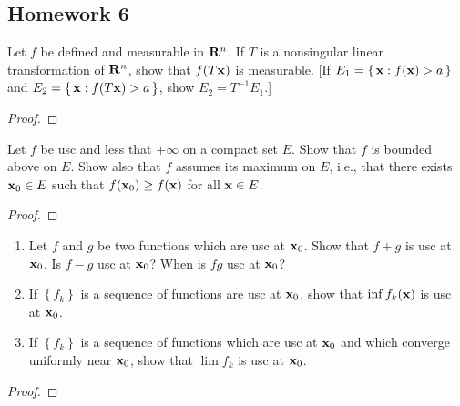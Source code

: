 \subsection{Homework 6}
\begin{problem}
Let $f$ be defined and measurable in $\mathbf{R}^n$. If $T$ is a nonsingular
linear transformation of $\mathbf{R}^n$, show that $f(T\mathbf{x})$ is measurable. [If
$E_1=\left\{\,\mathbf{x}: f(\mathbf{x})>a\,\right\}$ and
$E_2=\left\{\,\mathbf{x}:f(T\mathbf{x})>a\,\right\}$, show $E_2=T^{-1}E_1$.]
\end{problem}
\begin{proof}
\end{proof}

\begin{problem}
Let $f$ be usc and less that $+\infty$ on a compact set $E$. Show that $f$
is bounded above on $E$. Show also that $f$ assumes its maximum on $E$,
i.e., that there exists $\mathbf{x}_0\in E$ such that $f(\mathbf{x}_0)\geq f(\mathbf{x})$ for
all $\mathbf{x}\in E$.
\end{problem}
\begin{proof}
\end{proof}

\begin{problem}
\begin{enumerate}[label=(\alph*)]
\item Let $f$ and $g$ be two functions which are usc at $\mathbf{x}_0$. Show that
  $f+g$ is usc at $\mathbf{x}_0$. Is $f-g$ usc at $\mathbf{x}_0$? When is $fg$ usc at
  $\mathbf{x}_0$?
\item If $\left\{f_k\right\}$ is a sequence of functions are usc at
  $\mathbf{x}_0$, show that $\inf f_k(\mathbf{x})$ is usc at $\mathbf{x}_0$.
\item If $\left\{f_k\right\}$ is a sequence of functions which are usc at
  $\mathbf{x}_0$ and which converge uniformly near $\mathbf{x}_0$, show that $\lim f_k$
  is usc at $\mathbf{x}_0$.
\end{enumerate}
\end{problem}
\begin{proof}
\end{proof}

